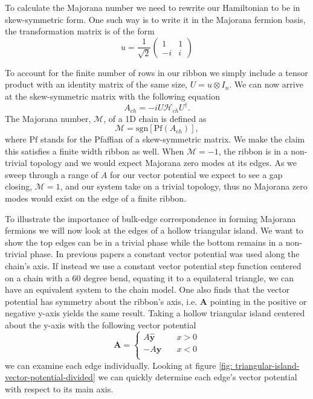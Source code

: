 \documentclass[aps,prb,showpacs,amsmath,amssymb,superscriptaddress]{revtex4-2}
\let\oldhat\hat
\renewcommand{\hat}[1]{\oldhat{\mathbf{#1}}}
\renewcommand{\vec}[1]{\mathbf{#1}}
\newcommand{\ham}{\mathcal{H}}
\begin{document}
To calculate the Majorana number we need to rewrite our Hamiltonian to be in skew-symmetric form.
One such way is to write it in the Majorana fermion basis, the transformation matrix is of the form
\begin{equation}
  u = \dfrac{1}{\sqrt{2}} \left(
  \begin{matrix}
    1 & 1 \\
    -i & i
  \end{matrix} \right)
\end{equation}

To account for the finite number of rows in our ribbon we simply include a tensor product with an identity matrix of the same size, $U = u \otimes I_n$.
We can now arrive at the skew-symmetric matrix with the following equation
\begin{equation}
  A_{ch} = -i U \ham_{ch} U^{\dagger}.
\end{equation}
The Majorana number, $\mathcal{M}$, of a 1D chain is defined as
\begin{equation}
  \mathcal{M} = \text{sgn}[\text{Pf}(A_{ch})],
\end{equation}
where $\text{Pf}$ stands for the Pfaffian of a skew-symmetric matrix.
We make the claim this satisfies a finite width ribbon as well.
When $\mathcal{M} = -1$, the ribbon is in a non-trivial topology and we would expect Majorana zero modes at its edges.
As we sweep through a range of $A$ for our vector potential we expect to see a gap closing, $\mathcal{M} = 1$, and our system take on a trivial topology, thus no Majorana zero modes would exist on the edge of a finite ribbon.

To illustrate the importance of bulk-edge correspondence in forming Majorana fermions we will now look at the edges of a hollow triangular island.
We want to show the top edges can be in a trivial phase while the bottom remains in a non-trivial phase.
In previous papers a constant vector potential was used along the chain's axis.
If instead we use a constant vector potential step function centered on a chain with a 60 degree bend, equating it to a equilateral triangle, we can have an equivalent system to the chain model.
One also finds that the vector potential has symmetry about the ribbon's axis, i.e. $\vec{A}$ pointing in the positive or negative y-axis yields the same result.
Taking a hollow triangular island centered about the y-axis with the following vector potential
\begin{equation}
  \vec{A} = \begin{cases}
            A \hat{y} \quad &x > 0 \\
            -A \hat{y} \quad &x < 0 \\
            \end{cases}
\end{equation}
we can examine each edge individually.
Looking at figure \ref{fig: triangular-island-vector-potential-divided} we can quickly determine each edge's vector potential with respect to its main axis.
\end{document}
